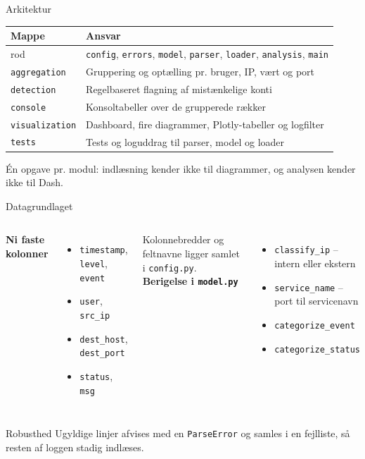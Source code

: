 \documentclass[aspectratio=169,10pt]{beamer}
\newcommand{\code}[1]{\texttt{\small #1}}
\begin{document}
\begin{frame}{Arkitektur}
  \centering
  \small
  \begin{tabularx}{\textwidth}{@{}l X@{}}
    \toprule
    \textbf{Mappe} & \textbf{Ansvar} \\
    \midrule
    rod            & \code{config}, \code{errors}, \code{model}, \code{parser}, \code{loader}, \code{analysis}, \code{main} \\
    \code{aggregation}  & Gruppering og optælling pr. bruger, IP, vært og port \\
    \code{detection}    & Regelbaseret flagning af mistænkelige konti \\
    \code{console}      & Konsoltabeller over de grupperede rækker \\
    \code{visualization}& Dashboard, fire diagrammer, Plotly-tabeller og logfilter \\
    \code{tests}        & Tests og loguddrag til parser, model og loader \\
    \bottomrule
  \end{tabularx}
  \vfill
  {\footnotesize\color{muted}Én opgave pr. modul: indlæsning kender ikke til diagrammer, og analysen kender ikke til Dash.}
\end{frame}

\begin{frame}{Datagrundlaget}
  \begin{columns}[T]
      \textbf{Ni faste kolonner}
      \vspace{0.3em}
      \begin{itemize}
        \item \code{timestamp}, \code{level}, \code{event}
        \item \code{user}, \code{src\_ip}
        \item \code{dest\_host}, \code{dest\_port}
        \item \code{status}, \code{msg}
      \end{itemize}
      \vspace{0.3em}
      {\footnotesize\color{muted}Kolonnebredder og feltnavne ligger samlet i \code{config.py}.}
      \textbf{Berigelse i \code{model.py}}
      \vspace{0.3em}
      \begin{itemize}
        \item \code{classify\_ip} -- intern eller ekstern
        \item \code{service\_name} -- port til servicenavn
        \item \code{categorize\_event}
        \item \code{categorize\_status}
      \end{itemize}
  \end{columns}
  \vspace{0.6em}
  \begin{block}{Robusthed}
    \small Ugyldige linjer afvises med en \code{ParseError} og samles i en fejlliste, så resten af loggen stadig indlæses.
  \end{block}
\end{frame}
\end{document}
